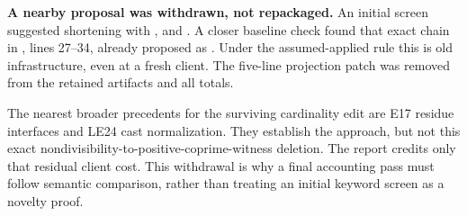 \textbf{A nearby proposal was withdrawn, not repackaged.} An initial screen suggested shortening  with ,  and . A closer baseline check found that exact chain in , lines 27--34, already proposed as . Under the assumed-applied rule this is old infrastructure, even at a fresh client. The five-line projection patch was removed from the retained artifacts and all totals.

The nearest broader precedents for the surviving cardinality edit are E17 residue interfaces and LE24 cast normalization. They establish the approach, but not this exact nondivisibility-to-positive-coprime-witness deletion. The report credits only that residual client cost. This withdrawal is why a final accounting pass must follow semantic comparison, rather than treating an initial keyword screen as a novelty proof.
